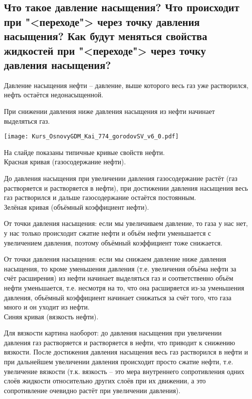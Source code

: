 

\subsection{Что такое давление насыщения? Что происходит при "<переходе"> через точку давления насыщения? Как будут меняться свойства жидкостей при "<переходе"> через  точку давления насыщения?}

Давление насыщения нефти -- давление, выше которого весь газ уже растворился, нефть остаётся недонасыщенной.

При снижении давления ниже давления насыщения из нефти начинает выделяться газ.

\texttt{[image: Kurs\_OsnovyGDM\_Kai\_774\_gorodovSV\_v6\_0.pdf]}

На слайде показаны типичные кривые свойств нефти.
\\

Красная кривая (газосодержание нефти).

До давления насыщения при увеличении давления газосодержание растёт (газ растворяется и растворяется в нефти), при достижении давления насыщения весь газ растворился и дальше газосодержание остаётся постоянным.
\\

Зелёная кривая (объёмный коэффициент нефти).

От точки давления насыщения: если мы увеличиваем давление, то газа у нас нет, у нас только происходит сжатие нефти и объём нефти уменьшается с увеличением давления, поэтому объёмный коэффициент тоже снижается.

От точки давления насыщения: если мы снижаем давление ниже давления насыщения, то кроме уменьшения давления (т.е. увеличения объёма нефти за счёт расширения) из нефти начинает выделяться газ и соответственно объём нефти уменьшается, т.е. несмотря на то, что она расширяется из-за уменьшения давления, объёмный коэффициент начинает снижаться за счёт того, что газа много и он уходит из нефти.
\\

Синяя кривая (вязкость нефти).

Для вязкости картина наоборот: до давления насыщения при увеличении давления газ растворяется и растворяется в нефти, что приводит к снижению вязкости.
После достижения давления насыщения весь газ растворился в нефти и при дальнейшем увеличении давления происходит просто сжатие нефти, т.е. увеличение вязкости (т.к. вязкость -- это мера внутреннего сопротивления одних слоёв жидкости относительно других слоёв при их движении, а это сопротивление очевидно растёт при увеличении давления).


